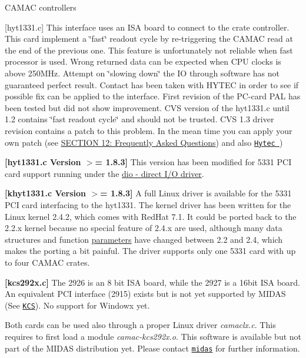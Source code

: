 \begin{DoxyItemize}
\item CAMAC controllers
\begin{DoxyItemize}
\item {\bfseries }\mbox{[}hyt1331.c\mbox{]} This interface uses an ISA board to connect to the crate controller. This card implement a \char`\"{}fast\char`\"{} readout cycle by re-\/triggering the CAMAC read at the end of the previous one. This feature is unfortunately not reliable when fast processor is used. Wrong returned data can be expected when CPU clocks is above 250MHz. Attempt on \char`\"{}slowing down\char`\"{} the IO through software has not guaranteed perfect result. Contact has been taken with HYTEC in order to see if possible fix can be applied to the interface. First revision of the PC-\/card PAL has been tested but did not show improvement. CVS version of the hyt1331.c until 1.2 contains \char`\"{}fast readout
  cycle\char`\"{} and should not be trusted. CVS 1.3 driver revision contains a patch to this problem. In the mean time you can apply your own patch (see \hyperlink{FAQ}{SECTION 12: Frequently Asked Questions}) and also \href{http://www.hytec-electronics.co.uk/index.html}{\tt Hytec })
\item {\bfseries  \mbox{[}hyt1331.c Version $>$= 1.8.3\mbox{]}} This version has been modified for 5331 PCI card support running under the \hyperlink{FE_utils_FE_dio_utility}{dio -\/ direct I/O driver}.
\item {\bfseries \mbox{[}khyt1331.c Version $>$= 1.8.3\mbox{]}} A full Linux driver is available for the 5331 PCI card interfacing to the hyt1331. The kernel driver has been written for the Linux kernel 2.4.2, which comes with RedHat 7.1. It could be ported back to the 2.2.x kernel because no special feature of 2.4.x are used, although many data structures and function \hyperlink{structparameters}{parameters} have changed between 2.2 and 2.4, which makes the porting a bit painful. The driver supports only one 5331 card with up to four CAMAC crates.
\item {\bfseries \mbox{[}kcs292x.c\mbox{]}} The 2926 is an 8 bit ISA board, while the 2927 is a 16bit ISA board. An equivalent PCI interface (2915) exists but is not yet supported by MIDAS (See \href{http://www.kscorp.com/www/camac/1000/2915.html}{\tt KCS}). No support for Windowx yet. \par
\par
 Both cards can be used also through a proper Linux driver {\itshape camaclx.c\/}. This requires to first load a module {\itshape camac-\/kcs292x.o\/}. This software is available but not part of the MIDAS distribution yet. Please contact \href{mailto:midas@triumf.ca?subject=KCS driver}{\tt midas} for further information. \par
\par


\end{DoxyItemize}
\end{DoxyItemize}
